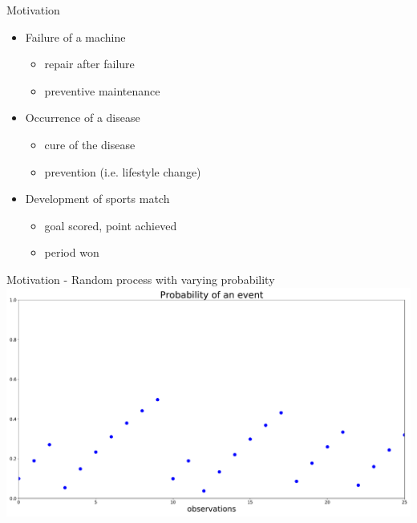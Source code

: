 \documentclass[american]{beamer}
\begin{document}
    \begin{frame}{Motivation}
        \begin{itemize}
            \item Failure of a machine
            \begin{itemize}
                \item repair after failure
                \item preventive maintenance
            \end{itemize}
            \item<2-> Occurrence of a disease
            \begin{itemize}
                \item cure of the disease
                \item prevention (i.e. lifestyle change)
            \end{itemize}
            \item<3-> Development of sports match
            \begin{itemize}
                \item goal scored, point achieved
                \item period won
            \end{itemize}
        \end{itemize}
    \end{frame}

    \begin{frame}{Motivation - Random process with varying probability}
        \includegraphics[width=1\textwidth]{../../simulations/probability_dots_25_steps_type_success_punished_two_lambdas}
    \end{frame}
\end{document}
